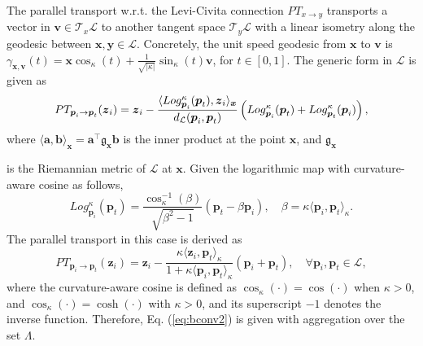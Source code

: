 The parallel transport w.r.t. the Levi-Civita connection $PT_{x\to y}$ transports a vector in $\boldsymbol v \in \mathcal T_x\mathcal L$ to another tangent space $\mathcal T_y\mathcal L$ with a linear isometry along the geodesic between $\boldsymbol x, \boldsymbol y \in \mathcal L$. 
Concretely, the unit speed geodesic from $\boldsymbol x$ to $\boldsymbol v$ is $\gamma_{\boldsymbol x, \boldsymbol v}(t)=\boldsymbol x\cos_\kappa(t) + \frac{1}{\sqrt{|\kappa|}}\sin_\kappa(t)\boldsymbol v$, for $t\in[0,1]$.
The generic form in $\mathcal L$ is given as
\vspace{-0.05in}
\begin{equation}
PT_{\boldsymbol p_i \to \boldsymbol p_t}(\boldsymbol z_i)=\boldsymbol z_i-\frac{\langle Log_{\boldsymbol p_i}^\kappa(\boldsymbol p_t), \boldsymbol z_i \rangle_{\boldsymbol x}}{d_{\mathcal L}(\boldsymbol p_i,\boldsymbol p_t)}\left(Log_{\boldsymbol p_i}^\kappa(\boldsymbol p_t)+Log_{\boldsymbol p_t}^\kappa(\boldsymbol p_i)\right),
\vspace{-0.03in}
\end{equation}
where $\langle \boldsymbol a, \boldsymbol b \rangle_{\boldsymbol x}=\boldsymbol a^\top\mathfrak{g}_{\boldsymbol x}\boldsymbol b$ is the inner product at the point $\boldsymbol x$, and $\mathfrak{g}_{\boldsymbol x}$

\noindent is  the Riemannian metric of $\mathcal L$ at $\boldsymbol x$.
Given the logarithmic map with curvature-aware cosine  as follows,
\begin{equation}
Log_{\boldsymbol p_i}^\kappa(\boldsymbol p_t)=\frac{\cos^{-1}_\kappa(\beta)}{\sqrt{\beta^2-1}}(\boldsymbol p_t-\beta\boldsymbol p_i), \quad \beta=\kappa\langle\boldsymbol p_i, \boldsymbol p_t\rangle_\kappa.
\end{equation}
The parallel transport in this case is derived as 
\begin{equation}
PT_{\boldsymbol p_i \to \boldsymbol p_t}(\boldsymbol z_i)=\boldsymbol z_i-\frac{\kappa \langle\boldsymbol z_i, \boldsymbol p_t\rangle_\kappa}{1+\kappa\langle\boldsymbol p_i, \boldsymbol p_t\rangle_\kappa}(\boldsymbol p_i+\boldsymbol p_t),  \quad \forall \boldsymbol p_i, \boldsymbol p_t \in \mathcal L,
\end{equation}
where the curvature-aware cosine is defined as $\cos_\kappa(\cdot)=\cos(\cdot)$ when $\kappa>0$, and $\cos_\kappa(\cdot)=\cosh(\cdot)$ with $\kappa>0$, and its superscript $-1$ denotes the inverse function.
Therefore, Eq. (\ref{eq:bconv2}) is given with aggregation over the set $\Lambda$.

